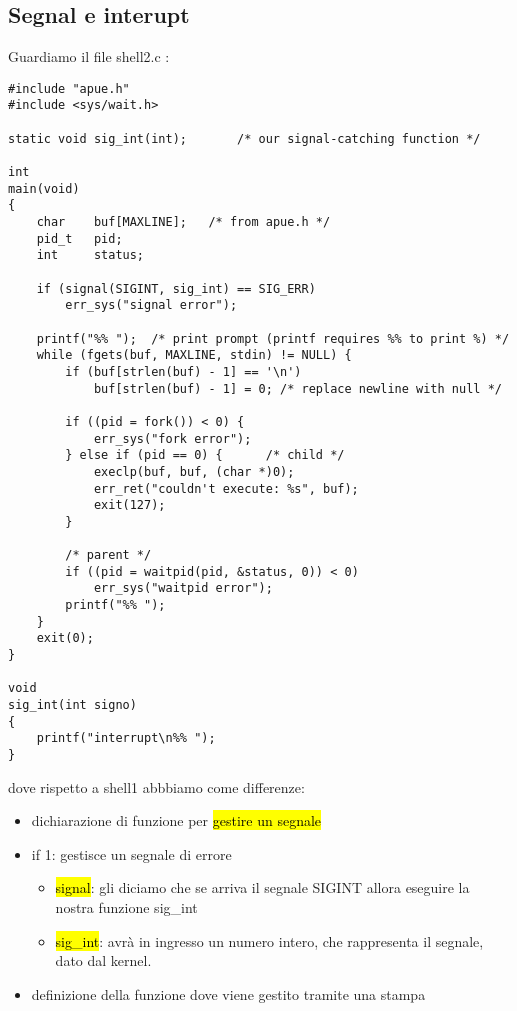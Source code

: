 \subsection{Segnal e interupt}

Guardiamo il file shell2.c :

\begin{lstlisting}
#include "apue.h"
#include <sys/wait.h>

static void	sig_int(int);		/* our signal-catching function */

int
main(void)
{
	char	buf[MAXLINE];	/* from apue.h */
	pid_t	pid;
	int		status;

	if (signal(SIGINT, sig_int) == SIG_ERR)
		err_sys("signal error");

	printf("%% ");	/* print prompt (printf requires %% to print %) */
	while (fgets(buf, MAXLINE, stdin) != NULL) {
		if (buf[strlen(buf) - 1] == '\n')
			buf[strlen(buf) - 1] = 0; /* replace newline with null */

		if ((pid = fork()) < 0) {
			err_sys("fork error");
		} else if (pid == 0) {		/* child */
			execlp(buf, buf, (char *)0);
			err_ret("couldn't execute: %s", buf);
			exit(127);
		}

		/* parent */
		if ((pid = waitpid(pid, &status, 0)) < 0)
			err_sys("waitpid error");
		printf("%% ");
	}
	exit(0);
}

void
sig_int(int signo)
{
	printf("interrupt\n%% ");
}
\end{lstlisting}

dove rispetto a shell1 abbbiamo come differenze:

\begin{itemize}
	\item dichiarazione di funzione per \hl{gestire un segnale}
	\item if 1: gestisce un segnale di errore
		
		\begin{itemize}
			\item \hl{signal}: gli diciamo che se arriva il segnale SIGINT allora eseguire la nostra funzione sig_int
			\item \hl{sig_int}: avrà in ingresso un numero intero, che rappresenta il segnale, dato dal kernel.
		\end{itemize}
		
	\item definizione della funzione dove viene gestito tramite una stampa
\end{itemize}

